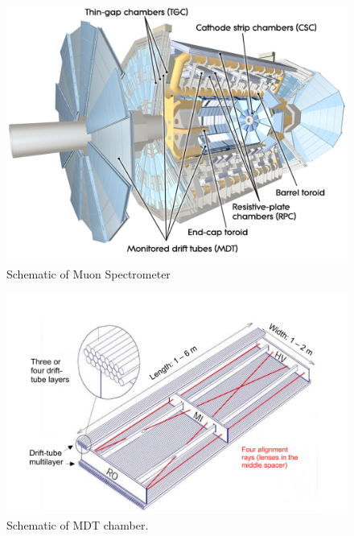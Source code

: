 \begin{figure}[h!]
  \centering
  \includegraphics[width=\hsize]{figures/Detector/muonsys.pdf}
  \caption{Schematic of Muon Spectrometer \cite{atlas_detector}} 
  \label{fig:muonsys}
\end{figure}
\FloatBarrier


\begin{figure}[h!]
  \centering
  \includegraphics[width=\hsize]{figures/Detector/muon_mdt.pdf}
  \caption{Schematic of MDT chamber.} 
  \label{fig:muon_mdt}
\end{figure}
\FloatBarrier


